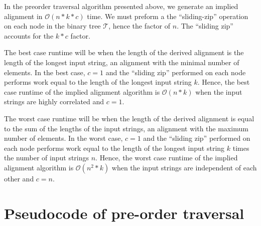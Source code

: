 \documentclass[11pt]{article}
\begin{document}
In the preorder traversal algorithm presented above, we generate an implied alignment in $\mathcal{O}(n * k * c)$ time.
We must preform a the ``sliding-zip'' operation on each node in the binary tree $\mathcal{T}$, hence the factor of $n$.
The ``sliding zip'' accounts for the $k * c$ factor.

The best case runtime will be when the length of the derived alignment is the length of the longest input string, an alignment with the minimal number of elements.
In the best case, $c = 1$ and the ``sliding zip'' performed on each node performs work equal to the length of the longest input string $k$.
Hence, the best case runtime of the implied alignment algorithm is $\mathcal{O}(n*k)$ when the input strings are highly correlated and $c = 1$.

The worst case runtime will be when the length of the derived alignment is equal to the sum of the lengths of the input strings, an alignment with the maximum number of elements.
In the worst case, $c = 1$ and the ``sliding zip'' performed on each node performs work equal to the length of the longest input string $k$ times the number of input strings $n$.
Hence, the worst case runtime of the implied alignment algorithm is $\mathcal{O}(n^2*k)$ when the input strings are independent of each other and $c = n$.



\section{Pseudocode of pre-order traversal}
\end{document}
